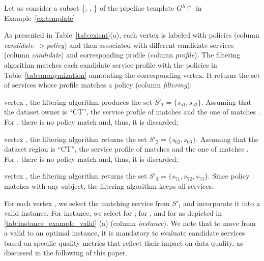 
\begin{example}[\bf \pipelineInstance]\label{ex:instance}

  Let us consider a subset \{, , \} of the pipeline template $G^{\lambda\,,\gamma\,}$ in Example~\ref{ex:template}.

  As presented in Table~\ref{tab:exisnt}(a), each vertex is labeled with policies (column \emph{candidate--$>$policy}) and then associated with different candidate services (column \emph{candidate}) and corresponding profile (column \emph{profile}). The filtering algorithm matches each candidate service profile with the policies in Table~\ref{tab:anonymization} annotating the corresponding vertex. It returns the set of services whose profile matches a policy (column \emph{filtering}):
  \begin{enumerate*}[label=\textit{\roman*})]
    \item vertex , the filtering algorithm produces the set $S'_1=\{s_{51},s_{52}\}$. Assuming that the dataset owner is ``CT'', the service profile of  matches  and the one of  matches . For , there is no policy match and, thus, it is discarded;
    \item vertex , the filtering algorithm returns the set $S'_2=\{s_{62},s_{63}\}$. Assuming that the dataset region is ``CT'', the service profile of  matches  and the one of  matches . For , there is no policy match and, thus, it is discarded;
    \item vertex , the filtering algorithm returns the set $S'_3=\{s_{71},s_{72},s_{73}\}$. Since policy  matches with any subject, the filtering algorithm keeps all services.
  \end{enumerate*}

  For each vertex , we select the matching service  from $S'_i$ and incorporate it into a valid instance. For instance, we select  for ;  for , and  for 
  as depicted in \cref{tab:instance_example_valid} (a) (column \emph{instance}). We note that to move from a valid to an optimal instance, it is mandatory to evaluate candidate services based on specific quality metrics that reflect their impact on data quality, as discussed in the following of this paper.


\end{example}
